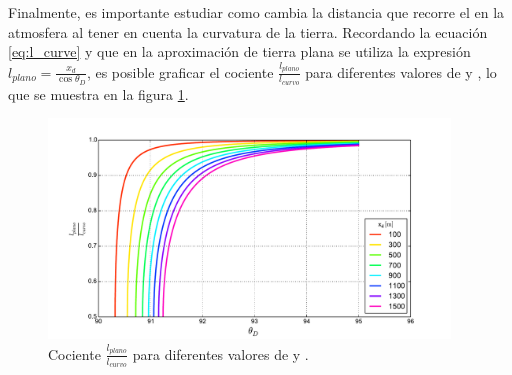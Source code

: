 	Finalmente, es importante estudiar como cambia la distancia que recorre el \tauon{} en la atmosfera al tener en cuenta la curvatura de la tierra.
	Recordando la ecuaci\'on \ref{eq:l_curve} y que en la aproximaci\'on de tierra plana se utiliza la expresi\'on $l_{plano}=\frac{x_d}{\cos \theta_D}$, es posible graficar el cociente $\frac{l_{plano}}{l_{curvo}}$ para diferentes valores de \xd{} y \td{}, lo que se muestra en la figura \ref{fig:lp_lc}.
	
	\begin{figure}[ht!]
		\centering
		\includegraphics[width=0.95\textwidth]{./fig/appendix/lPlane_lCurve}
		\caption{\label{fig:lp_lc}
		Cociente $\frac{l_{plano}}{l_{curvo}}$ para diferentes valores de \xd{} y \td{}.
		}
	\end{figure}

